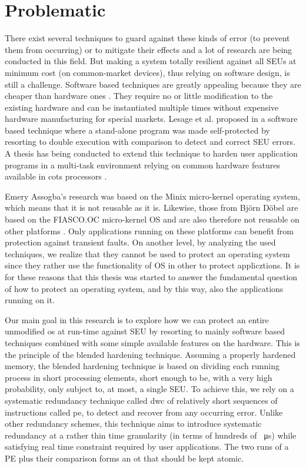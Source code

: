 \section{Problematic}

There exist several techniques to guard against these kinds of error (to prevent them from occurring) or to mitigate their effects and a lot of research are being conducted in this field. But making a system totally resilient against all SEUs at minimum cost (on common-market devices), thus relying on software design, is still a challenge. Software based techniques are greatly appealing because they are cheaper than hardware ones \citep{Madeira2002ExperimentalEO}. They require no or little modification to the existing hardware and can be instantiated multiple times without expensive hardware manufacturing for special markets. Lesage et al. proposed in \citep{lesage_software_2011} a software based technique where a stand-alone program was made self-protected by resorting to double execution with comparison to detect and correct SEU errors. A thesis has being conducted to extend this technique to harden user application programs in a multi-task environment relying on common hardware features available in \acrfull{cots} processors \citep{emery_assogba}. 

Emery Assogba's research was based on the Minix micro-kernel operating system, which means that it is not reusable as it is. Likewise, those from Björn Döbel are based on the FIASCO.OC micro-kernel OS and are also therefore not reusable on other platforms \citep{dobel_can_2014}. Only applications running on these platforms can benefit from protection against transient faults.
On another level, by analyzing the used techniques, we realize that they cannot be used to protect an operating system since they rather use the functionality of OS in other to protect applicztions.
It is for these reasons that this thesis was started to answer the fundamental question of how to protect an operating system, and by this way, also the applications running on it.

Our main goal in this research is to explore how we can protect an entire unmodified \acrfull{os} at run-time against SEU by resorting to mainly software based techniques combined with some simple available features on the hardware. This is the principle of the blended hardening technique. Assuming a properly hardened memory, the blended hardening technique is based on dividing each running process in short processing elements, short enough to be, with a very high probability, only subject to, at most, a single SEU. To achieve this, we rely on a systematic redundancy technique called \acrfull{dwc} of relatively short sequences of instructions called \acrfull{pe}, to detect and recover from any occurring error. Unlike other redundancy schemes, this technique aims to introduce systematic redundancy at a rather thin time granularity (in terms of hundreds of \SI{}{\micro\second}) while satisfying real time constraint required by user applications. The two runs of a PE plus their comparison forms an \acrfull{ot} that should be kept atomic.

